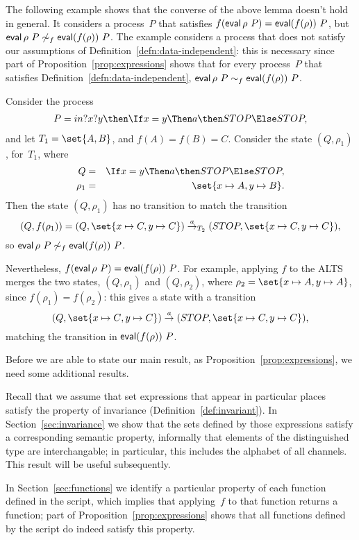 The following example shows that the converse of the above lemma doesn't hold
in general.  It considers a process~$P$ that satisfies $f(\mathop{\sf eval} \rho~P) =
\mathop{\sf eval} (f(\rho))~P$, but $\mathop{\sf eval} \rho~P \not\sim_f \mathop{\sf eval} (f(\rho))~P$.  The
example considers a process that does not satisfy our assumptions of
Definition~\ref{defn:data-independent}: this is necessary since part of
Proposition~\ref{prop:expressions} shows that for every process~$P$ that
satisfies Definition~\ref{defn:data-independent}, $\mathop{\sf eval} \rho~P
\sim_f \mathop{\sf eval} (f(\rho))~P$.
%
\begin{example}
Consider the process 
\begin{eqnarray*}
P = in?x?y \then \If x = y \Then a \then STOP \Else STOP,
\end{eqnarray*}
and let $T_1 = \set{A,B}$, and $f(A) = f(B) = C$.  
%
Consider the state $(Q,\rho_1)$, for~$T_1$, where
%
\begin{eqnarray*}
Q & = & \If x = y \Then a \then STOP \Else STOP, \\
\rho_1 & =  & \set{x \mapsto A, y \mapsto B}.
\end{eqnarray*}
%
Then the state $(Q, \rho_1)$ has no transition to match the transition
\[
(Q, f(\rho_1)) = (Q, \set{x \mapsto C, y \mapsto C}) \trans{a}_{T_2} 
  (STOP, \set{x \mapsto C, y \mapsto C}),
\]
so  $\mathop{\sf eval} \rho~P \not\sim_f \mathop{\sf eval} (f(\rho))~P$.

Nevertheless, $f(\mathop{\sf eval} \rho~P) = \mathop{\sf eval} (f(\rho))~P$.  For example, applying
$f$ to the ALTS merges the two states, $(Q,\rho_1)$ and $(Q,\rho_2)$, where
$\rho_2 = \set{x \mapsto A,\linebreak[1] {y \mapsto A}}$, since $f(\rho_1) =
f(\rho_2)$: this gives a state with a transition 
\[
(Q, \set{{x \mapsto C}, y \mapsto C}) \trans{a}
   (STOP, \set{x \mapsto C, y \mapsto C}),
\]
matching the transition in $\mathop{\sf eval} (f(\rho))~P$.
\end{example}


Before we are able to state our main result, as
Proposition~\ref{prop:expressions}, we need some additional results.

Recall that we assume that set expressions that appear in particular places
satisfy the property of invariance (Definition~\ref{def:invariant}).  In
Section~\ref{sec:invariance} we show that the sets defined by those
expressions satisfy a corresponding semantic property, informally that
elements of the distinguished type are interchangable; in particular, this
includes the alphabet of all channels.  This result will be useful
subsequently. 

In Section~\ref{sec:functions} we identify a particular property of each
function defined in the script, which implies that applying~$f$ to that
function returns a function; part of Proposition~\ref{prop:expressions} shows
that all functions defined by the script do indeed satisfy this property.

